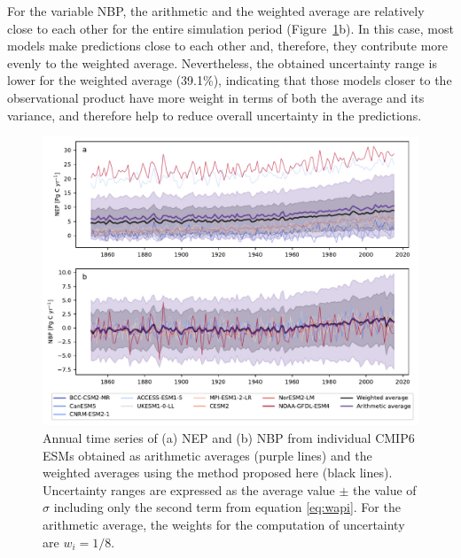 \documentclass[gmd, manuscript]{copernicus}
\begin{document}
For the variable NBP, the arithmetic and the weighted average are relatively close to each other for the entire simulation period (Figure~\ref{fig:averages}b). In this case, most models make predictions close to each other and, therefore, they contribute more evenly to the weighted average. Nevertheless, the obtained uncertainty range is lower for the weighted average (39.1\%), indicating that those models closer to the observational product have more weight in terms of both the average and its variance, and therefore help to reduce overall uncertainty in the predictions. 


\begin{figure}[t]
   \centering
   \includegraphics[width=14cm]{Figures/Time_series_NXP_c1.pdf} %
   \caption{Annual time series of (a) NEP and (b) NBP from individual CMIP6 ESMs obtained as arithmetic averages (purple lines) and the weighted averages using the method proposed here (black lines). Uncertainty ranges are expressed as the average value $\pm$ the value of $\sigma$ including only the second term from equation \ref{eq:wapi}. For the arithmetic average, the weights for the computation of uncertainty are $w_i = 1/8$.}
   \label{fig:averages}
\end{figure}
\end{document}
